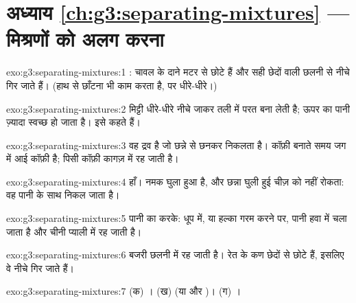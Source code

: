 \section*{अध्याय \ref{ch:g3:separating-mixtures} --- मिश्रणों को अलग करना}

\begin{solution}{exo:g3:separating-mixtures:1}
: चावल के दाने मटर से छोटे हैं और सही छेदों वाली छलनी से नीचे
गिर जाते हैं। (हाथ से छाँटना भी काम करता है, पर धीरे-धीरे।)
\end{solution}

\begin{solution}{exo:g3:separating-mixtures:2}
मिट्टी धीरे-धीरे नीचे जाकर तली में परत बना लेती है; ऊपर का पानी
ज़्यादा स्वच्छ हो जाता है। इसे  कहते हैं।
\end{solution}

\begin{solution}{exo:g3:separating-mixtures:3}
 वह द्रव है जो छन्ने से छनकर निकलता है। कॉफ़ी बनाते समय
 जग में आई कॉफ़ी है; पिसी कॉफ़ी कागज़ में रह
जाती है।
\end{solution}

\begin{solution}{exo:g3:separating-mixtures:4}
हाँ। नमक घुला हुआ है, और छन्ना घुली हुई चीज़ को नहीं रोकता: वह पानी के
साथ निकल जाता है।
\end{solution}

\begin{solution}{exo:g3:separating-mixtures:5}
पानी का  करके: धूप में, या हल्का गरम करने पर, पानी हवा में चला
जाता है और चीनी प्याली में रह जाती है।
\end{solution}

\begin{solution}{exo:g3:separating-mixtures:6}
बजरी छलनी में रह जाती है। रेत के कण छेदों से छोटे हैं, इसलिए वे
नीचे गिर जाते हैं।
\end{solution}

\begin{solution}{exo:g3:separating-mixtures:7}
(क) । (ख)  (या  और )। (ग) ।
\end{solution}


